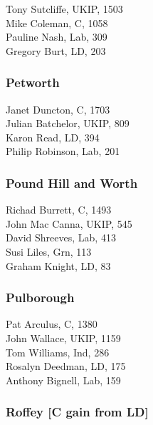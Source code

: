\documentclass[a4paper,openany,10pt]{book}
\begin{document}


Tony Sutcliffe, UKIP, 1503\\
Mike Coleman, C, 1058\\
Pauline Nash, Lab, 309\\
Gregory Burt, LD, 203\\


\subsubsection*{Petworth}



Janet Duncton, C, 1703\\
Julian Batchelor, UKIP, 809\\
Karon Read, LD, 394\\
Philip Robinson, Lab, 201\\


\subsubsection*{Pound Hill and Worth}



Richad Burrett, C, 1493\\
John Mac Canna, UKIP, 545\\
David Shreeves, Lab, 413\\
Susi Liles, Grn, 113\\
Graham Knight, LD, 83\\


\subsubsection*{Pulborough}



Pat Arculus, C, 1380\\
John Wallace, UKIP, 1159\\
Tom Williams, Ind, 286\\
Rosalyn Deedman, LD, 175\\
Anthony Bignell, Lab, 159\\


\subsubsection*{Roffey \hspace*{\fill}\nolinebreak[1]%
\enspace\hspace*{\fill}
[C gain from LD]}
\end{document}
